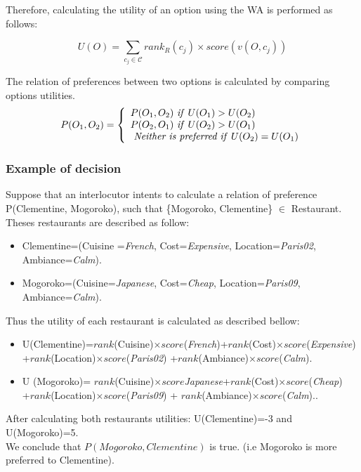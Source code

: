 \documentclass{llncs}
\begin{document}
Therefore, calculating the utility of an option using the WA is performed as follows: 

 \[U(O) = \sum_{c_j \in \mathcal{C}}  rank_R(c_j) \times score\left( v(O, c_j) \right) \] 
 
 
 \par The relation of preferences between two options is calculated by comparing  options utilities. 
  \[ P(O_1, O_2)  = \left \{
    \begin{array}{l}
	P(O_1, O_2)$ \textit{if}  $U(O_1) > U(O_2) \\
	P(O_2, O_1)$  \textit{if}  $U(O_2) > U(O_1) \\
	$  \textit{Neither is preferred if}  $U(O_2) = U(O_1)\\
    \end{array}
    \right .\]
  
 
\subsubsection{Example of decision}

Suppose that an interlocutor intents to calculate a relation of preference  P(Clementine, Mogoroko), such that 
\{Mogoroko, Clementine\} $\in$ Restaurant. Theses restaurants are described as follow: 
\begin{itemize}
\item Clementine=(Cuisine =\textit{French}, Cost=\textit{Expensive}, Location=\textit{Paris02},
 \\Ambiance=\textit{Calm}).
\item Mogoroko=(Cuisine=\textit{Japanese}, Cost=\textit{Cheap}, Location=\textit{Paris09}, 
\\Ambiance=\textit{Calm}).
\end{itemize}

Thus the utility of each restaurant is calculated as described bellow: 
\begin{itemize}
\item U(Clementine)=$rank$(Cuisine)$\times score$(\textit{French})+$rank$(Cost)$\times score$(\textit{Expensive})\\+$rank$(Location)$\times score$(\textit{Paris02})
+$rank$(Ambiance)$\times score$(\textit{Calm}).
\item U (Mogoroko)= $rank$(Cuisine)$\times score$\textit{Japanese}+$rank$(Cost)$\times score$(\textit{Cheap})\\+$rank$(Location)$\times score$(\textit{Paris09}) +  
$rank$(Ambiance)$\times score$(\textit{Calm})..
\end{itemize}
After calculating both restaurants utilities: U(Clementine)=-3 and U(Mogoroko)=5.
\\  We conclude that $P(Mogoroko, Clementine)$ is true.
 (i.e Mogoroko is more preferred to Clementine).
\end{document}
